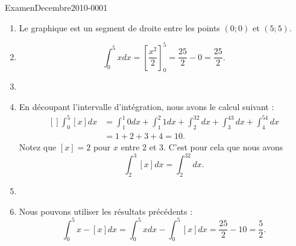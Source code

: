
\begin{corrige}{ExamenDecembre2010-0001}

	\begin{enumerate}
		\item
			Le graphique est un segment de droite entre les points $(0;0)$ et $(5;5)$.
		\item
			\begin{equation}
				\int_0^5xdx=\left[ \frac{ x^2 }{2} \right]^5_0=\frac{ 25 }{2}-0=\frac{ 25 }{2}.
			\end{equation}
		\item
		\item
			En découpant l'intervalle d'intégration, nous avons le calcul suivant :
			\begin{equation}
				\begin{aligned}[]
					\int_0^5[x]dx&=\int_1^1 0dx+\int_1^2 1dx+\int_2^32dx+\int_3^43dx+\int_4^54dx\\
					&=1+2+3+4=10.
				\end{aligned}
			\end{equation}
			Notez que $[x]=2$ pour $x$ entre $2$ et $3$. C'est pour cela que nous avons
			\begin{equation}
				\int_2^3[x]dx=\int_2^32dx.
			\end{equation}
			
		\item
		\item
			Nous pouvons utiliser les résultats précédents :
			\begin{equation}
				\int_0^5x-[x]dx=\int_0^5xdx-\int_0^5[x]dx=\frac{ 25 }{ 2 }-10=\frac{ 5 }{2}.
			\end{equation}

	\end{enumerate}

\end{corrige}
